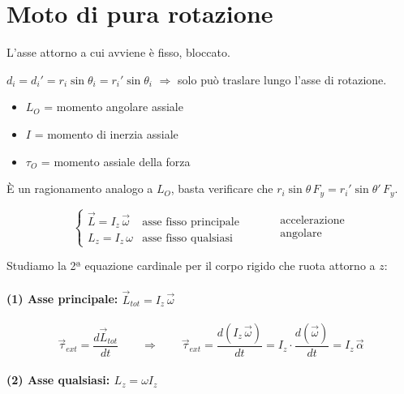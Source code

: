 
\section{Moto di pura rotazione}

L'asse attorno a cui avviene è fisso, bloccato.

$d_i = d_i' = r_i \sin\theta_i = r_i' \sin\theta_i$ $\Rightarrow$ solo può traslare lungo l'asse di rotazione.


\begin{itemize}
    \item $L_O$ = momento angolare assiale
    \item $I$ = momento di inerzia assiale
    \item $\tau_O$ = momento assiale della forza
\end{itemize}

È un ragionamento analogo a $L_O$, basta verificare che $r_i \sin\theta\, F_y = r_i' \sin\theta'\, F_y$.

\[
\begin{cases}
\vec{L} = I_z\,\vec{\omega} & \text{asse fisso principale} \\
L_z = I_z\,\omega & \text{asse fisso qualsiasi}
\end{cases}
\qquad
\begin{aligned}
& \text{accelerazione} \\
& \text{angolare}
\end{aligned}
\]

Studiamo la 2ª equazione cardinale per il corpo rigido che ruota attorno a $z$:

\paragraph{(1) Asse principale: $\vec{L}_{tot} = I_z\,\vec{\omega}$}

\begin{equation}
\vec{\tau}_{ext} = \frac{d\vec{L}_{tot}}{dt} \qquad \Rightarrow \qquad \boxed{\vec{\tau}_{ext}} = \frac{d(I_z\,\vec{\omega})}{dt} = I_z \cdot \frac{d(\vec{\omega})}{dt} = \boxed{I_z\,\vec{\alpha}}
\end{equation}

\paragraph{(2) Asse qualsiasi: $L_z = \omega I_z$}

